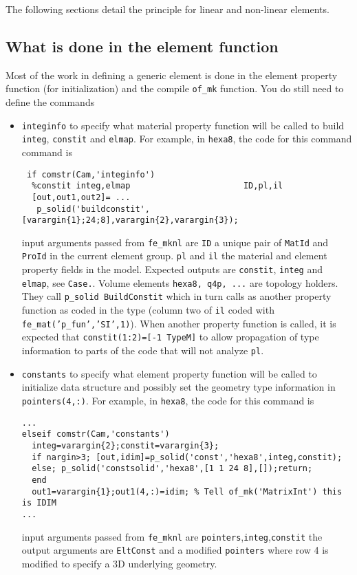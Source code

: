 The following sections detail the principle for linear and non-linear elements.

\subsection{What is done in the element function} %

Most of the work in defining a generic element is done in the element property function (for initialization) and the compile {\tt of\_mk} function. You do still need to define the commands

\begin{itemize}
\item {\tt integinfo} to specify what material property function will be called to build {\tt integ}, {\tt constit} and {\tt elmap}. For example, in {\tt hexa8}, the code for this command command is

\begin{verbatim}
 if comstr(Cam,'integinfo')
  %constit integ,elmap                       ID,pl,il
  [out,out1,out2]= ...
   p_solid('buildconstit',[varargin{1};24;8],varargin{2},varargin{3});
\end{verbatim}
%
input arguments passed from {\tt fe\_mknl} are {\tt ID} a unique pair of {\tt MatId} and {\tt ProId} in the current element group. {\tt pl} and {\tt il} the material and element property fields in the model. Expected outputs are {\tt constit}, {\tt integ} and {\tt elmap}, see {\tt Case.}.  Volume elements {\tt hexa8, q4p, ...}  are topology holders. They call {\tt p\_solid BuildConstit} which in turn calls as another property function as coded in the type (column two of {\tt il} coded with {\tt fe\_mat('p\_fun','SI',1)}). When another property function is called, it is expected that {\tt constit(1:2)=[-1 TypeM]} to allow propagation of type information to parts of the code that will not analyze {\tt pl}. 

\item {\tt constants} to specify what element property function will be called to initialize  data structure and possibly set the geometry type information in {\tt pointers(4,:)}. For example, in {\tt hexa8}, the code for this command is

\begin{verbatim}
...
elseif comstr(Cam,'constants') 
  integ=varargin{2};constit=varargin{3};
  if nargin>3; [out,idim]=p_solid('const','hexa8',integ,constit);
  else; p_solid('constsolid','hexa8',[1 1 24 8],[]);return;
  end
  out1=varargin{1};out1(4,:)=idim; % Tell of_mk('MatrixInt') this is IDIM 
...
\end{verbatim}
%
input arguments passed from {\tt fe\_mknl} are {\tt pointers},{\tt integ},{\tt constit} the output arguments are {\tt EltConst} and a modified {\tt pointers} where row 4 is modified to specify a 3D underlying geometry.  


\end{itemize}
